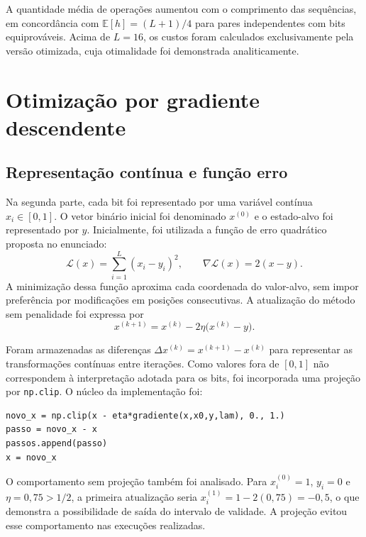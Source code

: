 \documentclass[10pt,a4paper,twocolumn]{article}
\begin{document}
A quantidade média de operações aumentou com o comprimento das sequências, em concordância com $\mathbb{E}[h]=(L+1)/4$ para pares independentes com bits equiprováveis. Acima de $L=16$, os custos foram calculados exclusivamente pela versão otimizada, cuja otimalidade foi demonstrada analiticamente.

\section{Otimização por gradiente descendente}
\subsection{Representação contínua e função erro}
Na segunda parte, cada bit foi representado por uma variável contínua $x_i\in[0,1]$. O vetor binário inicial foi denominado $x^{(0)}$ e o estado-alvo foi representado por $y$. Inicialmente, foi utilizada a função de erro quadrático proposta no enunciado:
\begin{equation}
\mathcal{L}(x)=\sum_{i=1}^L(x_i-y_i)^2,
\qquad \nabla\mathcal{L}(x)=2(x-y).
\end{equation}
A minimização dessa função aproxima cada coordenada do valor-alvo, sem impor preferência por modificações em posições consecutivas. A atualização do método sem penalidade foi expressa por
\begin{equation}
x^{(k+1)}=x^{(k)}-2\eta\bigl(x^{(k)}-y\bigr).
\end{equation}

Foram armazenadas as diferenças $\Delta x^{(k)}=x^{(k+1)}-x^{(k)}$ para representar as transformações contínuas entre iterações. Como valores fora de $[0,1]$ não correspondem à interpretação adotada para os bits, foi incorporada uma projeção por \texttt{np.clip}. O núcleo da implementação foi:
\begin{lstlisting}
novo_x = np.clip(x - eta*gradiente(x,x0,y,lam), 0., 1.)
passo = novo_x - x
passos.append(passo)
x = novo_x
\end{lstlisting}

O comportamento sem projeção também foi analisado. Para $x_i^{(0)}=1$, $y_i=0$ e $\eta=0{,}75>1/2$, a primeira atualização seria $x_i^{(1)}=1-2(0{,}75)=-0{,}5$, o que demonstra a possibilidade de saída do intervalo de validade. A projeção evitou esse comportamento nas execuções realizadas.
\end{document}
